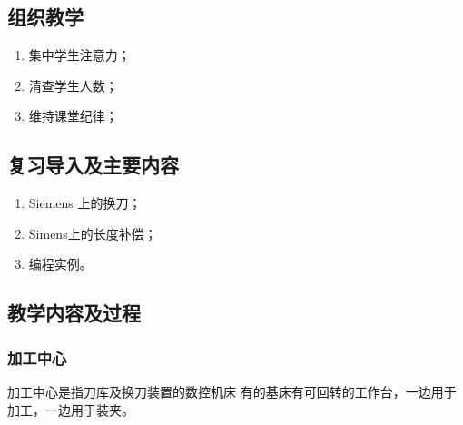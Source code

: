 \jxhj{%
	}

\makeshouye %

\subsection{组织教学}
\begin{enumerate}[\hspace{2em}1、]
	\item 集中学生注意力；
	\item 清查学生人数；
	\item 维持课堂纪律；
\end{enumerate}

\subsection{复习导入及主要内容}
\begin{enumerate}[1、]
\item Siemens 上的换刀；
\item Simens上的长度补偿；
\item 编程实例。
\end{enumerate}

\subsection{教学内容及过程}
\subsubsection{加工中心}

加工中心是指刀库及换刀装置的数控机床
有的基床有可回转的工作台，一边用于加工，一边用于装夹。

